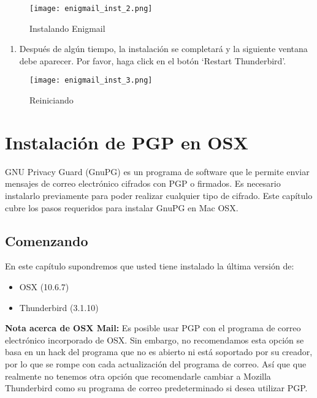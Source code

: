 \documentclass[10pt,a5paper,twoside,,]{book}
\providecommand{\tightlist}{%
  \setlength{\itemsep}{0pt}\setlength{\parskip}{0pt}}
\begin{document}
\begin{figure}[htbp]
\centering
\texttt{[image: enigmail\_inst\_2.png]}
\caption{Instalando Enigmail}
\end{figure}

\begin{enumerate}
\def\labelenumi{\arabic{enumi}.}
\setcounter{enumi}{4}
\tightlist
\item
  Después de algún tiempo, la instalación se completará y la siguiente
  ventana debe aparecer. Por favor, haga click en el botón `Restart
  Thunderbird'.
\end{enumerate}

\begin{figure}[htbp]
\centering
\texttt{[image: enigmail\_inst\_3.png]}
\caption{Reiniciando}
\end{figure}

\chapter{Instalación de PGP en OSX}\label{instalaciuxf3n-de-pgp-en-osx}

GNU Privacy Guard (GnuPG) es un programa de software que le permite
enviar mensajes de correo electrónico cifrados con PGP o firmados. Es
necesario instalarlo previamente para poder realizar cualquier tipo de
cifrado. Este capítulo cubre los pasos requeridos para instalar GnuPG en
Mac OSX.

\section{Comenzando}\label{comenzando}

En este capítulo supondremos que usted tiene instalado la última versión
de:

\begin{itemize}
\tightlist
\item
  OSX (10.6.7)
\item
  Thunderbird (3.1.10)
\end{itemize}

\textbf{Nota acerca de OSX Mail:} Es posible usar PGP con el programa de
correo electrónico incorporado de OSX. Sin embargo, no recomendamos esta
opción se basa en un hack del programa que no es abierto ni está
soportado por su creador, por lo que se rompe con cada actualización del
programa de correo. Así que que realmente no tenemos otra opción que
recomendarle cambiar a Mozilla Thunderbird como su programa de correo
predeterminado si desea utilizar PGP.
\end{document}
